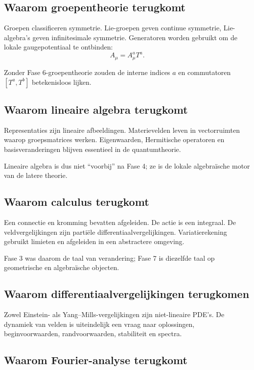 \documentclass[11pt,a4paper]{article}
\begin{document}
\subsection{Waarom groepentheorie terugkomt}

Groepen classificeren symmetrie. Lie-groepen geven continue symmetrie, Lie-algebra's geven infinitesimale symmetrie. Generatoren worden gebruikt om de lokale gaugepotentiaal te ontbinden:
\[
A_\mu=A_\mu^aT^a.
\]

Zonder Fase 6-groepentheorie zouden de interne indices $a$ en commutatoren $[T^a,T^b]$ betekenisloos lijken.

\subsection{Waarom lineaire algebra terugkomt}

Representaties zijn lineaire afbeeldingen. Materievelden leven in vectorruimten waarop groepsmatrices werken. Eigenwaarden, Hermitische operatoren en basisveranderingen blijven essentieel in de quantumtheorie.

Lineaire algebra is dus niet ``voorbij'' na Fase 4; ze is de lokale algebraïsche motor van de latere theorie.

\subsection{Waarom calculus terugkomt}

Een connectie en kromming bevatten afgeleiden. De actie is een integraal. De veldvergelijkingen zijn partiële differentiaalvergelijkingen. Variatierekening gebruikt limieten en afgeleiden in een abstractere omgeving.

Fase 3 was daarom de taal van verandering; Fase 7 is diezelfde taal op geometrische en algebraïsche objecten.

\subsection{Waarom differentiaalvergelijkingen terugkomen}

Zowel Einstein- als Yang--Mills-vergelijkingen zijn niet-lineaire PDE's. De dynamiek van velden is uiteindelijk een vraag naar oplossingen, beginvoorwaarden, randvoorwaarden, stabiliteit en spectra.

\subsection{Waarom Fourier-analyse terugkomt}
\end{document}
